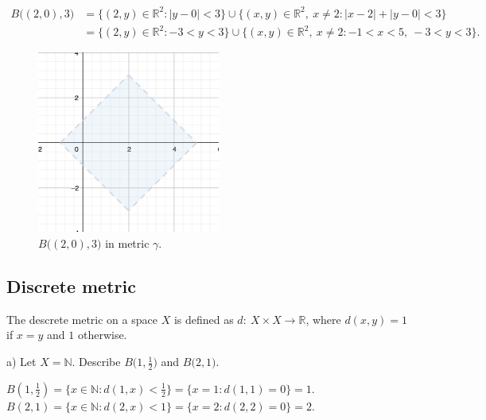 \documentclass[a4paper,11pt]{article}
\begin{document}
\begin{align*} 
    B \big((2, 0), 3 \big) &= \{(2,y) \in \mathbb{R}^2 : |y - 0| < 3 \} \cup \{(x,y) \in \mathbb{R}^2, \ x \neq 2 : |x - 2| + |y - 0| < 3 \}
    \\
    &= \{(2,y) \in \mathbb{R}^2 : -3 < y < 3 \} \cup \{(x,y) \in \mathbb{R}^2 , \ x \neq 2: -1 < x < 5, \ -3< y < 3 \}.
\end{align*}

\begin{figure}[ht!]
    \centering
    \includegraphics[width=60mm]{d3.png}
    \caption{$B \big((2, 0), 3 \big)$ in metric $\gamma$.}
\end{figure}




\newpage
\subsection{Discrete metric}
The descrete metric on a space $X$ is defined as $d: \ X \times X \to \mathbb{R}$, where $d(x, y) = 1$ if $x = y$ and $1$ otherwise.

\noindent
a) Let $X = \mathbb{N}$. Describe $B \big(1, \frac{1}{2} \big)$ and $B \big(2, 1 \big)$.

\begin{center}
$ B \left(1, \frac{1}{2} \right) = \{ x \in \mathbb{N} : d(1, x) < \frac{1}{2} \} = \{ x = 1 : d(1, 1) = 0 \} = {1}. $
\\
$ B (2, 1) = \{ x \in \mathbb{N} : d(2, x) < 1 \} = \{ x = 2 : d(2, 2) = 0 \} = {2}. $
\\
\end{center}

\end{document}
